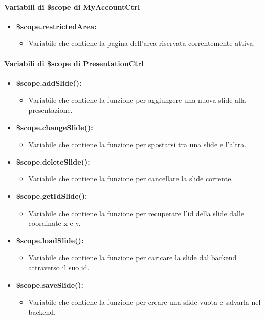 \paragraph{Variabili di \$scope di MyAccountCtrl}
\begin{itemize}
	\item \textbf{\$scope.restrictedArea:}
	\begin{itemize}
		\item Variabile che contiene la pagina dell'area riservata correntemente attiva.
	\end{itemize}
\end{itemize}


\paragraph{Variabili di \$scope di PresentationCtrl}
\begin{itemize}
	\item \textbf{\$scope.addSlide():}
	\begin{itemize}
		\item Variabile che contiene la funzione per aggiungere una nuova slide alla presentazione.
	\end{itemize}
	
	\item \textbf{\$scope.changeSlide():}
	\begin{itemize}
		\item Variabile che contiene la funzione per spostarsi tra una slide e l'altra.
	\end{itemize}
	
	\item \textbf{\$scope.deleteSlide():}
	\begin{itemize}
		\item Variabile che contiene la funzione per cancellare la slide corrente.
	\end{itemize}
	
	\item \textbf{\$scope.getIdSlide():}
	\begin{itemize}
		\item Variabile che contiene la funzione per recuperare l'id della slide dalle coordinate x e y.
	\end{itemize}
	
	\item \textbf{\$scope.loadSlide():}
	\begin{itemize}
		\item Variabile che contiene la funzione per caricare la slide dal backend attraverso il suo id.
	\end{itemize}
		
	\item \textbf{\$scope.saveSlide():}
	\begin{itemize}
		\item Variabile che contiene la funzione per creare una slide vuota e salvarla nel backend.
	\end{itemize}
\end{itemize}


